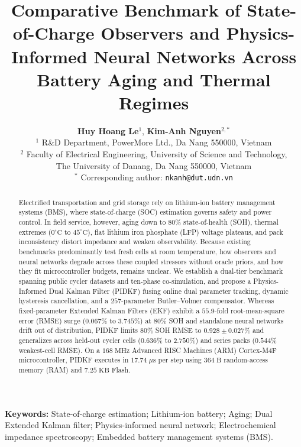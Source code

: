 \documentclass[10pt,a4paper]{article}
\title{\LARGE \textbf{Comparative Benchmark of State-of-Charge Observers and Physics-Informed Neural Networks Across Battery Aging and Thermal Regimes}}
\author{
  \textbf{Huy Hoang Le}$^{1}$, \textbf{Kim-Anh Nguyen}$^{2,*}$\\[0.6em]
  \small $^{1}$ R\&D Department, PowerMore Ltd., Da Nang 550000, Vietnam\\[0.2em]
  \small $^{2}$ Faculty of Electrical Engineering, University of Science and Technology,\\
  \small The University of Danang, Da Nang 550000, Vietnam\\[0.3em]
  \small $^{*}$ Corresponding author: \texttt{nkanh@dut.udn.vn}
}
\date{}
\providecommand{\upmu}{\mu}
\begin{document}
\maketitle

\begin{abstract}
Electrified transportation and grid storage rely on lithium-ion battery management systems (BMS), where state-of-charge (SOC) estimation governs safety and power control. In field service, however, aging down to $80\%$ state-of-health (SOH), thermal extremes ($0^\circ\text{C}$ to $45^\circ\text{C}$), flat lithium iron phosphate (LFP) voltage plateaus, and pack inconsistency distort impedance and weaken observability. Because existing benchmarks predominantly test fresh cells at room temperature, how observers and neural networks degrade across these coupled stressors without oracle priors, and how they fit microcontroller budgets, remains unclear. We establish a dual-tier benchmark spanning public cycler datasets and ten-phase co-simulation, and propose a Physics-Informed Dual Kalman Filter (PIDKF) fusing online dual parameter tracking, dynamic hysteresis cancellation, and a $257$-parameter Butler--Volmer compensator. Whereas fixed-parameter Extended Kalman Filters (EKF) exhibit a $55.9$-fold root-mean-square error (RMSE) surge ($0.067\%$ to $3.745\%$) at $80\%$ SOH and standalone neural networks drift out of distribution, PIDKF limits $80\%$ SOH RMSE to $0.928\pm0.027\%$ and generalizes across held-out cycler cells ($0.636\%$ to $2.750\%$) and series packs ($0.544\%$ weakest-cell RMSE). On a $168\;\mathrm{MHz}$ Advanced RISC Machines (ARM) Cortex-M4F microcontroller, PIDKF executes in $17.74\;\upmu\mathrm{s}$ per step using $364\;\mathrm{B}$ random-access memory (RAM) and $7.25\;\mathrm{KB}$ Flash.
\end{abstract}

\vspace{0.8em}
\noindent \textbf{Keywords:} State-of-charge estimation; Lithium-ion battery; Aging; Dual Extended Kalman filter; Physics-informed neural network; Electrochemical impedance spectroscopy; Embedded battery management systems (BMS).
\vspace{1.2em}
\end{document}

